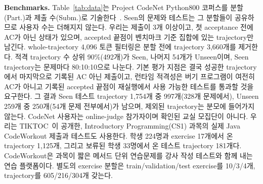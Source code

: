\documentclass[10pt,conference]{IEEEtran}
\begin{document}
\noindent\textbf{Benchmarks.} Table~\ref{tab:data}는 Project CodeNet Python800 코퍼스를 분할(Part.)과 제출 수(Subm.)로 기술한다~\cite{puri2021codenet}. Seen의 문제와 테스트는 그 분할들이 공유하므로 사용자 수는 더해지지 않는다. 우리는 제출이 3개 이상이고, 첫 acceptance 전에 AC가 아닌 상태가 있으며, accepted 끝점이 벤치마크 기준 집합에 있는 trajectory만 남긴다. whole-trajectory 4,096 토큰 필터링은 분할 전에 trajectory 3,660개를 제거한다. 적격 trajectory 수 상위 90\%(492개)가 Seen, 나머지 54개가 Unseen이며, Seen trajectory는 문제마다 80:10:10으로 나눈다. 기본 평가 지점은 결국 성공한 trajectory에서 마지막으로 기록된 AC 아닌 제출이고, 런타임 적격성은 버기 프로그램이 여전히 AC가 아니고 기록된 accepted 끝점이 재실행에서 사용 가능한 테스트를 통과할 것을 요구한다. 그 결과 Seen 테스트 trajectory 1,754개 중 997개(328개 문제에서), Unseen 259개 중 250개(54개 문제 전부에서)가 남으며, 제외된 trajectory는 분모에 들어가지 않는다. CodeNet 사용자는 online-judge 참가자이며 확인된 교실 모집단이 아니다. 우리는 TIKTOC~\cite{duan2024tiktoc}이 공개한, Introductory Programming(CS1) 과목의 실제 Java CodeWorkout 제출과 테스트도 사용한다. 학생 224명과 exercise 17개에서 온 trajectory 1,125개, 그리고 보류된 학생 33명에서 온 테스트 trajectory 181개다. CodeWorkout은 과목이 짧은 메서드 단위 연습문제를 강사 작성 테스트와 함께 내는 연습 플랫폼이다. 별도의 exercise 분할은 train/validation/test exercise를 10/3/4개, trajectory를 605/216/304개 갖는다.
\end{document}
